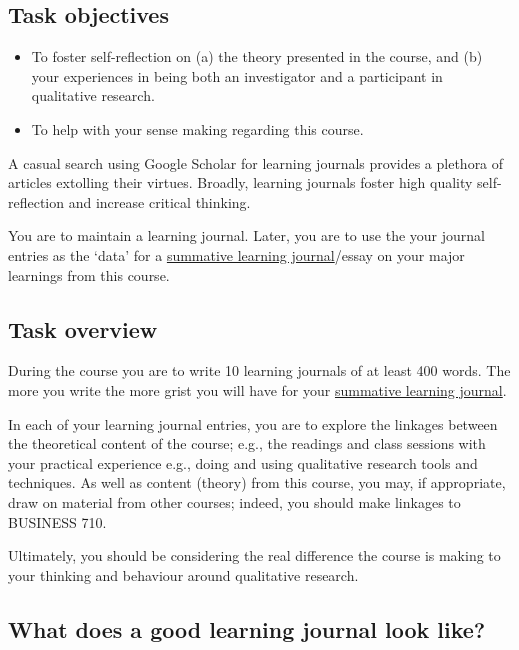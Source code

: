 \documentclass[]{book}
\theoremstyle{definition}
\theoremstyle{definition}
\theoremstyle{definition}
\theoremstyle{remark}
\begin{document}
\hypertarget{task-objectives}{%
\subsection*{Task objectives}\label{task-objectives}}

\begin{itemize}
\item
  To foster self-reflection on (a) the theory presented in the course,
  and (b) your experiences in being both an investigator and a
  participant in qualitative research.
\item
  To help with your sense making
  \autocite{weick_1995_sensemakingorganizations} regarding this course.
\end{itemize}

A casual search using Google Scholar for learning journals provides a
plethora of articles extolling their virtues. Broadly, learning journals
foster high quality self-reflection and increase critical thinking.

You are to maintain a learning journal. Later, you are to use the your
journal entries as the `data' for a \protect\hyperlink{ass4}{summative
learning journal}/essay on your major learnings from this course.

\hypertarget{task-overview}{%
\subsection*{Task overview}\label{task-overview}}

During the course you are to write 10 learning journals of at least 400
words. The more you write the more grist you will have for your
\protect\hyperlink{ass4}{summative learning journal}.

In each of your learning journal entries, you are to explore the
linkages between the theoretical content of the course; e.g., the
readings and class sessions with your practical experience e.g., doing
and using qualitative research tools and techniques. As well as content
(theory) from this course, you may, if appropriate, draw on material
from other courses; indeed, you should make linkages to BUSINESS 710.

Ultimately, you should be considering the real difference the course is
making to your thinking and behaviour around qualitative research.

\hypertarget{what-does-a-good-learning-journal-look-like}{%
\subsection*{What does a good learning journal look
like?}\label{what-does-a-good-learning-journal-look-like}}
\end{document}
